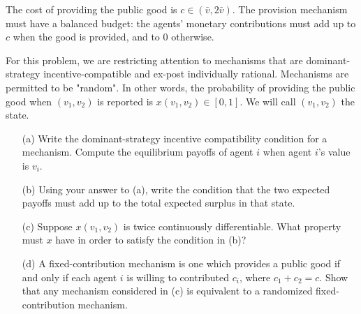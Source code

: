 \documentclass[10pt,a4paper]{article}
\begin{document}
  The cost of providing the public good is $c \in (\bar{v}, 2\bar{v})$. The provision mechanism must have a balanced budget: the agents' monetary contributions must add up to $c$ when the good is provided, and to 0 otherwise.

  For this problem, we are restricting attention to mechanisms that are dominant-strategy incentive-compatible and ex-post individually rational. Mechanisms are permitted to be "random". In other words, the probability of providing the public good when $(v_1, v_2)$ is reported is $x(v_1, v_2) \in [0, 1]$. We will call $(v_1, v_2)$ the state.

  \begin{enumerate}
      \item[(a)] Write the dominant-strategy incentive compatibility condition for a mechanism. Compute the equilibrium payoffs of agent $i$ when agent $i$'s value is $v_i$.
      \item[(b)] Using your answer to (a), write the condition that the two expected payoffs must add up to the total expected surplus in that state.
      \item[(c)] Suppose $x(v_1, v_2)$ is twice continuously differentiable. What property must $x$ have in order to satisfy the condition in (b)?
      \item[(d)] A fixed-contribution mechanism is one which provides a public good if and only if each agent $i$ is willing to contributed $c_i$, where $c_1 + c_2 = c$. Show that any mechanism considered in (c) is equivalent to a randomized fixed-contribution mechanism.
  \end{enumerate}
\end{document}
